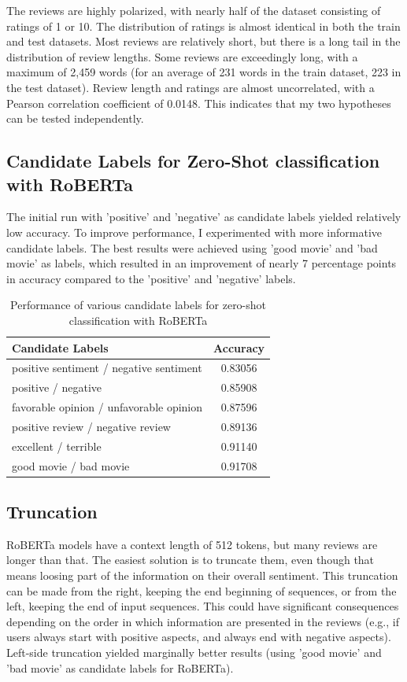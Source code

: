 \documentclass{article}
\begin{document}
The reviews are highly polarized, with nearly half of the dataset consisting of ratings of 1 or 10. The distribution of ratings is almost identical in both the train and test datasets. Most reviews are relatively short, but there is a long tail in the distribution of review lengths. Some reviews are exceedingly long, with a maximum of 2,459 words (for an average of 231 words in the train dataset, 223 in the test dataset). Review length and ratings are almost uncorrelated, with a Pearson correlation coefficient of 0.0148. This indicates that my two hypotheses can be tested independently.

\subsection{Candidate Labels for Zero-Shot classification with RoBERTa}

The initial run with 'positive' and 'negative' as candidate labels yielded relatively low accuracy. To improve performance, I experimented with more informative candidate labels. The best results were achieved using 'good movie' and 'bad movie' as labels, which resulted in an improvement of nearly 7 percentage points in accuracy compared to the 'positive' and 'negative' labels.

\begin{table}
  \caption{Performance of various candidate labels for zero-shot classification with RoBERTa}
  \label{tab:labels_zero_shot}
  \centering
  \begin{tabular}{lc}
    \toprule
    Candidate Labels & Accuracy \\
    \midrule
    positive sentiment / negative sentiment & 0.83056 \\
    positive / negative & 0.85908 \\
    favorable opinion / unfavorable opinion & 0.87596 \\
    positive review / negative review & 0.89136 \\
    excellent / terrible & 0.91140 \\
    good movie / bad movie & 0.91708 \\
    \bottomrule
  \end{tabular}
\end{table}

\subsection{Truncation}

RoBERTa models have a context length of 512 tokens, but many reviews are longer than that. The easiest solution is to truncate them, even though that means loosing part of the information on their overall sentiment. This truncation can be made from the right, keeping the end beginning of sequences, or from the left, keeping the end of input sequences. This could have significant consequences depending on the order in which information are presented in the reviews (e.g., if users always start with positive aspects, and always end with negative aspects). Left-side truncation yielded marginally better results (using 'good movie' and 'bad movie' as candidate labels for RoBERTa).
\end{document}
